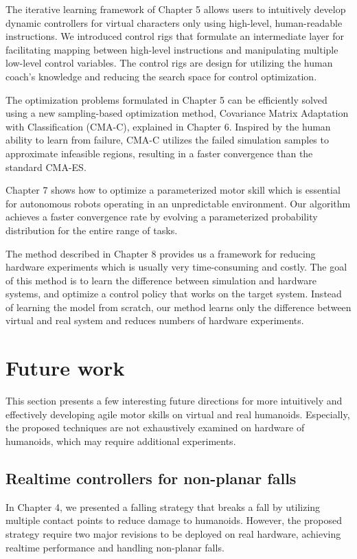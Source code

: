 The iterative learning framework of Chapter 5 allows users to intuitively
develop dynamic controllers for virtual characters only using high-level,
human-readable instructions.
We introduced control rigs that
formulate an intermediate layer 
for facilitating mapping between high-level instructions and manipulating
multiple low-level control variables.
The control rigs are design for utilizing the human coach's knowledge and 
reducing the search space for control optimization.

The optimization problems formulated in Chapter 5 can be efficiently solved
using a new sampling-based optimization method, Covariance Matrix
Adaptation with Classification (CMA-C), explained in Chapter 6.
Inspired by the human ability to learn from failure,
CMA-C utilizes the failed simulation samples to approximate infeasible regions,
resulting in a faster convergence than the standard CMA-ES.

Chapter 7 shows how to optimize a parameterized motor skill which
is essential for autonomous robots operating in an unpredictable environment.
Our algorithm achieves a faster convergence rate by evolving a parameterized
probability distribution for the entire range of tasks.

The method described in Chapter 8 provides us a framework for reducing hardware
experiments which is usually very time-consuming and costly.
The goal of this method is to learn the difference between simulation and
hardware systems, and optimize a control policy that works on the target system.
Instead of learning the model from scratch, our method learns only the
difference between virtual and real system and reduces
numbers of hardware experiments.

\section{Future work}
This section presents a few interesting future directions for more intuitively
and effectively developing agile motor skills on virtual and real humanoids.
Especially, the proposed techniques are not exhaustively examined on hardware
of humanoids, which may require additional experiments.

\subsection{Realtime controllers for non-planar falls}
In Chapter 4, we presented a falling strategy that breaks a fall by
utilizing multiple contact points to reduce damage to humanoids.
However, the proposed strategy require two major revisions to be deployed 
on real hardware, achieving realtime performance and handling non-planar falls.

